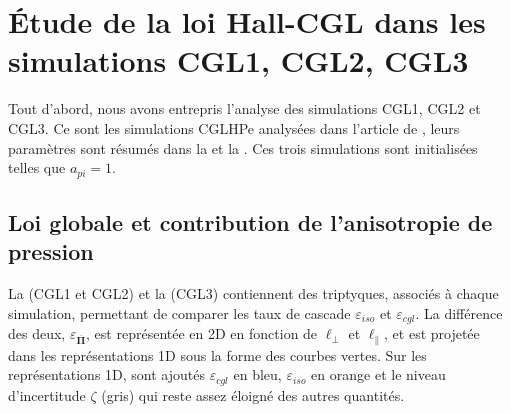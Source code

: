 \section{Étude de la loi Hall-CGL dans les simulations CGL1, CGL2, CGL3 }
\label{sec-332} 

Tout d'abord, nous avons entrepris l'analyse des simulations CGL1, CGL2 et CGL3.
Ce sont les simulations \acs{CGLHPe} analysées dans l'article de \cite{ferrand_fluid_2021}, leurs paramètres sont résumés dans la  et la . Ces trois simulations sont initialisées telles que $a_{pi} = 1$. 

\subsection{Loi globale et contribution de l'anisotropie de pression}
La  (CGL1 et CGL2) et la  (CGL3) contiennent des triptyques, associés à chaque simulation, permettant de comparer les taux de cascade $\varepsilon_{iso} $  et  $\varepsilon_{cgl}$. La différence des deux, $\varepsilon_{\overline{\boldsymbol{\Pi}}} $, est représentée en \acs{2D} en fonction de $\ell_{\perp}$ et $\ell_{\parallel}$, et est projetée dans les représentations \acs{1D} sous la forme des courbes vertes. Sur les représentations \acs{1D}, sont ajoutés $\varepsilon_{cgl}$ en bleu, $\varepsilon_{iso}$ en orange et le niveau d'incertitude $\zeta$ (gris) qui reste assez éloigné des autres quantités.

